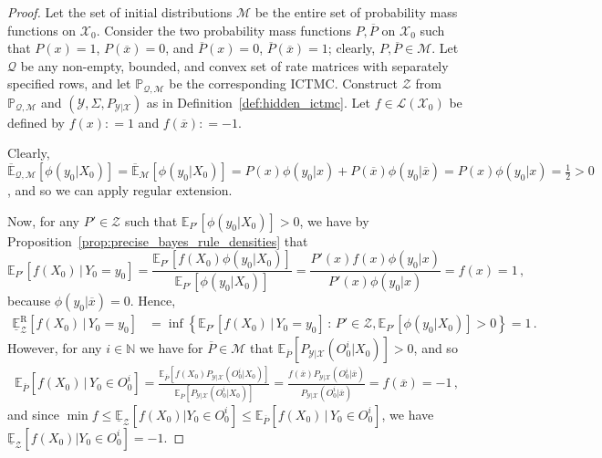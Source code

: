 \documentclass[twoside,11pt]{article}
\newcommand{\nats}{\mathbb{N}}
\newcommand{\states}{\mathcal{X}}
\newcommand{\observs}{\mathcal{Y}}
\newcommand{\uexp}{\overline{\mathbb{E}}_{\rateset,\mathcal{M}}}
\newcommand{\gambles}{\mathcal{L}}
\newcommand{\rateset}{\mathcal{Q}}
\newcommand{\coloneqq}{:\!=}
\begin{document}
\begin{proof}
Let the set of initial distributions $\mathcal{M}$ be the entire set of probability mass functions on $\states_0$. Consider the two probability mass functions $P,\overline{P}$ on $\states_0$ such that $P(x)=1$, $P(\overline{x})=0$, and $\overline{P}(x)=0$, $\overline{P}(\overline{x})=1$; clearly, $P,\overline{P}\in\mathcal{M}$. Let $\rateset$ be any non-empty, bounded, and convex set of rate matrices with separately specified rows, and let $\mathbb{P}_{\rateset,\mathcal{M}}$ be the corresponding ICTMC. Construct $\mathcal{Z}$ from $\mathbb{P}_{\rateset,\mathcal{M}}$ and $(\observs,\Sigma,P_{\observs\vert\states})$ as in Definition~\ref{def:hidden_ictmc}. Let $f\in\gambles(\states_0)$ be defined by $f(x)\coloneqq 1$ and $f(\overline{x})\coloneqq -1$. 

Clearly, $\uexp[\phi(y_0\vert X_0)]=\overline{\mathbb{E}}_\mathcal{M}[\phi(y_0\vert X_0)] = P(x)\phi(y_0\vert x) + P(\overline{x})\phi(y_0\vert \overline{x})=P(x)\phi(y_0\vert x) = \frac{1}{2}>0$, and so we can apply regular extension.

Now, for any $P'\in\mathcal{Z}$ such that $\mathbb{E}_{P'}[\phi(y_0\vert X_0)]>0$, we have by Proposition~\ref{prop:precise_bayes_rule_densities} that
\begin{equation*}
\mathbb{E}_{P'}[f(X_0)\,\vert\,Y_0=y_0] = \frac{\mathbb{E}_{P'}[f(X_0)\phi(y_0\vert X_0)]}{\mathbb{E}_{P'}[\phi(y_0\vert X_0)]} = \frac{P'(x)f(x)\phi(y_0\vert x)}{P'(x)\phi(y_0\vert x)} = f(x) = 1\,,
\end{equation*}
because $\phi(y_0\vert \overline{x})=0$. Hence,
\begin{align*}
\underline{\mathbb{E}}_\mathcal{Z}^\mathrm{R}[f(X_0)\,\vert\, Y_0=y_0] &= \inf\left\{ \mathbb{E}_{P'}[f(X_0)\,\vert\,Y_0=y_0]\,:\,P'\in\mathcal{Z}, \mathbb{E}_{P'}[\phi(y_0\vert X_0)]>0  \right\} = 1\,.
\end{align*}
However, for any $i\in\nats$ we have for $\overline{P}\in\mathcal{M}$ that %
$\mathbb{E}_{\overline{P}}[P_{\observs\vert\states}(O_0^i\vert X_0)]>0$, and so
\begin{align*}
\mathbb{E}_{\overline{P}}[f(X_0)\,\vert\,Y_0\in O_0^i] = \frac{\mathbb{E}_{\overline{P}}[f(X_0)P_{\observs\vert\states}(O_0^i\vert X_0)]}{\mathbb{E}_{\overline{P}}[P_{\observs\vert\states}(O_0^i\vert X_0)]} = \frac{f(\overline{x})P_{\observs\vert\states}(O_0^i\vert \overline{x})}{P_{\observs\vert\states}(O_0^i\vert \overline{x})} = f(\overline{x}) = -1\,,
\end{align*}
and since $\min f \leq \underline{\mathbb{E}}_\mathcal{Z}[f(X_0)\vert Y_0\in O_0^i] \leq \mathbb{E}_{\overline{P}}[f(X_0)\,\vert\,Y_0\in O_0^i]$, we have $\underline{\mathbb{E}}_\mathcal{Z}[f(X_0)\vert Y_0\in O_0^i]=-1$.


\end{proof}
\end{document}
